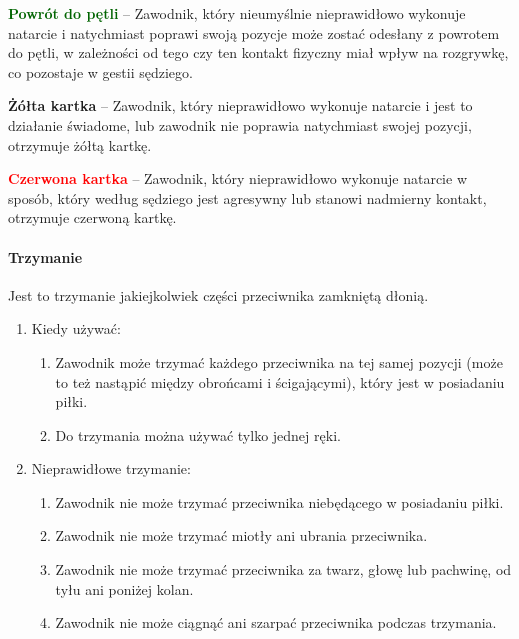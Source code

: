 \documentclass[12pt]{article}
\newcommand\redcard[1]{\bgroup\textcolor{red}{\textbf{#1}}}
\newcommand\yellowcard[1]{\bgroup\textcolor{darkyellow}{\textbf{#1}}}
\newcommand\other[1]{\bgroup\textcolor{darkgreen}{\textbf{#1}}}
\begin{document}
\other{Powrót do pętli} -- Zawodnik, który nieumyślnie nieprawidłowo
wykonuje natarcie i natychmiast poprawi swoją pozycje może zostać
odesłany z powrotem do pętli, w zależności od tego czy ten kontakt
fizyczny miał wpływ na rozgrywkę, co pozostaje w gestii sędziego.

\yellowcard{Żółta kartka} -- Zawodnik, który nieprawidłowo wykonuje natarcie i
jest to działanie świadome, lub zawodnik nie poprawia natychmiast swojej
pozycji, otrzymuje żółtą kartkę.

\redcard{Czerwona kartka} -- Zawodnik, który nieprawidłowo wykonuje natarcie
w sposób, który według sędziego jest agresywny lub stanowi nadmierny
kontakt, otrzymuje czerwoną kartkę.

\paragraph{Trzymanie}
Jest to trzymanie jakiejkolwiek części
przeciwnika zamkniętą dłonią.

\begin{enumerate}
	\item
	      Kiedy używać:

	      \begin{enumerate}
		      \item Zawodnik może trzymać każdego przeciwnika na tej samej pozycji
		            (może to też nastąpić między obrońcami i ścigającymi), który jest w
		            posiadaniu piłki.
		      \item
		            Do trzymania można używać tylko jednej ręki.
	      \end{enumerate}
	\item
	      Nieprawidłowe trzymanie:

	      \begin{enumerate}
		      \item
		            Zawodnik nie może trzymać przeciwnika niebędącego w posiadaniu
		            piłki.
		      \item
		            Zawodnik nie może trzymać miotły ani ubrania przeciwnika.
		      \item
		            Zawodnik nie może trzymać przeciwnika za twarz, głowę lub pachwinę,
		            od tyłu ani poniżej kolan.
		      \item Zawodnik nie może ciągnąć ani szarpać przeciwnika podczas
		            trzymania.
	      \end{enumerate}
\end{enumerate}
\end{document}
